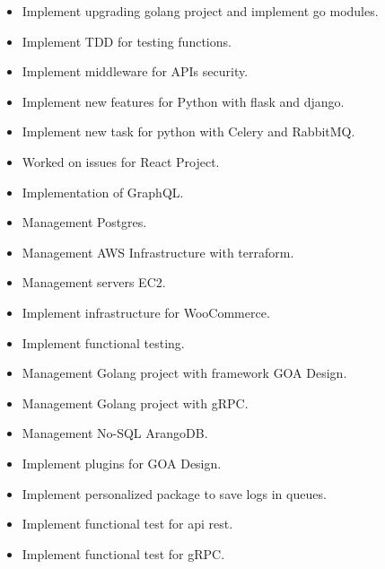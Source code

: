 

\begin{itemize}
    \item Implement upgrading golang project and implement go modules.
    \item Implement TDD for testing functions.
    \item Implement middleware for APIs security.
    \item Implement new features for Python with flask and django.
    \item Implement new task for python with Celery and RabbitMQ.
    \item Worked on issues for React Project.
\end{itemize}

\divider

\begin{itemize}
    \item Implementation of GraphQL.
    \item Management Postgres.
    \item Management AWS Infrastructure with terraform.
    \item Management servers EC2.
    \item Implement infrastructure for WooCommerce.
    \item Implement functional testing.
\end{itemize}

\divider

\begin{itemize}
    \item Management Golang project with framework GOA Design.
    \item Management Golang project with gRPC.
    \item Management No-SQL ArangoDB.
    \item Implement plugins for GOA Design.
    \item Implement personalized package to save logs in queues.
    \item Implement functional test for api rest.
    \item Implement functional test for gRPC.
\end{itemize}

